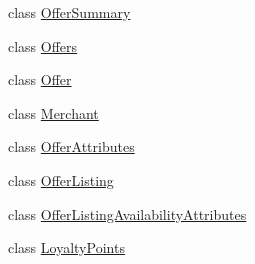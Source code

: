 \begin{DoxyCompactItemize}
class \hyperlink{class_amazon___price___finder_1_1amazon_1_1ecs_1_1_offer_summary}{Offer\-Summary}
\begin{DoxyCompactList}\small\item\em \end{DoxyCompactList}\item 
class \hyperlink{class_amazon___price___finder_1_1amazon_1_1ecs_1_1_offers}{Offers}
\begin{DoxyCompactList}\small\item\em \end{DoxyCompactList}\item 
class \hyperlink{class_amazon___price___finder_1_1amazon_1_1ecs_1_1_offer}{Offer}
\begin{DoxyCompactList}\small\item\em \end{DoxyCompactList}\item 
class \hyperlink{class_amazon___price___finder_1_1amazon_1_1ecs_1_1_merchant}{Merchant}
\begin{DoxyCompactList}\small\item\em \end{DoxyCompactList}\item 
class \hyperlink{class_amazon___price___finder_1_1amazon_1_1ecs_1_1_offer_attributes}{Offer\-Attributes}
\begin{DoxyCompactList}\small\item\em \end{DoxyCompactList}\item 
class \hyperlink{class_amazon___price___finder_1_1amazon_1_1ecs_1_1_offer_listing}{Offer\-Listing}
\begin{DoxyCompactList}\small\item\em \end{DoxyCompactList}\item 
class \hyperlink{class_amazon___price___finder_1_1amazon_1_1ecs_1_1_offer_listing_availability_attributes}{Offer\-Listing\-Availability\-Attributes}
\begin{DoxyCompactList}\small\item\em \end{DoxyCompactList}\item 
class \hyperlink{class_amazon___price___finder_1_1amazon_1_1ecs_1_1_loyalty_points}{Loyalty\-Points}
\begin{DoxyCompactList}\small\item\em \end{DoxyCompactList}\item 

\end{DoxyCompactItemize}
